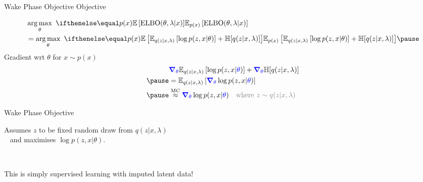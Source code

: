 \begin{frame}{Wake Phase Objective}
Objective  %

\vspace{-15pt}

\begin{equation*}
\begin{aligned}
&\argmax_{\theta}~ \E[p(x)]{\ELBO(\theta, \lambda|x)} \\
&=\argmax_{\theta}~ \E[p(x)]{\mathbb E_{q(z|x, \lambda)}\left[ \log p(z, x| \theta) \right] + \mathbb H[q(z|x, \lambda)] } \pause
\end{aligned}
\end{equation*}
\vspace{-2pt}
Gradient wrt $\theta$ for $x \sim p(x)$
\begin{equation*}
\begin{aligned}
& \textcolor{blue}{\grad_\theta}  \mathbb E_{q(z|x, {\lambda})}\left[ \log p(z, x| \textcolor{blue}{\theta}) \right] + \textcolor{blue}{\grad_\theta} \mathbb H[q(z|x, {\lambda})] \\ \pause 
&=\mathbb E_{q(z|x, {\lambda})}\left[ \textcolor{blue}{\grad_\theta} \log p(z, x| \textcolor{blue}{\theta}) \right] \\ \pause
&\overset{\text{MC}}{\approx} \textcolor{blue}{\grad_\theta} \log p(z, x| \textcolor{blue}{\theta}) \quad \textcolor{gray}{\text{where } z \sim q(z|x, \lambda)}
\end{aligned}
\end{equation*} 
 
\end{frame}

\begin{frame}{Wake Phase Objective}

Assumes  $ z $ to be fixed random draw from $ q(z|x,\lambda) $ \\
~ and maximises $\log p(z, x|\theta)$.

~


This is simply supervised learning with imputed latent data!

\end{frame}


